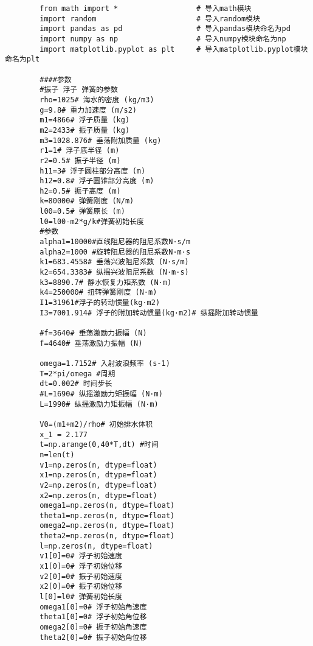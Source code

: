 \documentclass[a4paper,12pt]{article}
\begin{document}
	\begin{lstlisting}
		from math import *                  # 导入math模块
		import random                       # 导入random模块
		import pandas as pd                 # 导入pandas模块命名为pd
		import numpy as np                  # 导入numpy模块命名为np
		import matplotlib.pyplot as plt     # 导入matplotlib.pyplot模块命名为plt
		
		####参数
		#振子 浮子 弹簧的参数
		rho=1025# 海水的密度 (kg/m3)
		g=9.8# 重力加速度 (m/s2)
		m1=4866# 浮子质量 (kg)
		m2=2433# 振子质量 (kg)
		m3=1028.876# 垂荡附加质量 (kg)
		r1=1# 浮子底半径 (m)
		r2=0.5# 振子半径 (m)
		h11=3# 浮子圆柱部分高度 (m)
		h12=0.8# 浮子圆锥部分高度 (m)
		h2=0.5# 振子高度 (m)
		k=80000# 弹簧刚度 (N/m)
		l00=0.5# 弹簧原长 (m)
		l0=l00-m2*g/k#弹簧初始长度
		#参数
		alpha1=10000#直线阻尼器的阻尼系数N·s/m
		alpha2=1000 #旋转阻尼器的阻尼系数N·m·s
		k1=683.4558# 垂荡兴波阻尼系数 (N·s/m)
		k2=654.3383# 纵摇兴波阻尼系数 (N·m·s)
		k3=8890.7# 静水恢复力矩系数 (N·m)
		k4=250000# 扭转弹簧刚度 (N·m)
		I1=31961#浮子的转动惯量(kg·m2)
		I3=7001.914# 浮子的附加转动惯量(kg·m2)# 纵摇附加转动惯量
		
		#f=3640# 垂荡激励力振幅 (N)
		f=4640# 垂荡激励力振幅 (N)
		
		omega=1.7152# 入射波浪频率 (s-1)
		T=2*pi/omega #周期
		dt=0.002# 时间步长
		#L=1690# 纵摇激励力矩振幅 (N·m)
		L=1990# 纵摇激励力矩振幅 (N·m)
		
		V0=(m1+m2)/rho# 初始排水体积
		x_1 = 2.177
		t=np.arange(0,40*T,dt) #时间
		n=len(t)
		v1=np.zeros(n, dtype=float)
		x1=np.zeros(n, dtype=float)
		v2=np.zeros(n, dtype=float)
		x2=np.zeros(n, dtype=float)
		omega1=np.zeros(n, dtype=float)
		theta1=np.zeros(n, dtype=float)
		omega2=np.zeros(n, dtype=float)
		theta2=np.zeros(n, dtype=float)
		l=np.zeros(n, dtype=float)
		v1[0]=0# 浮子初始速度
		x1[0]=0# 浮子初始位移
		v2[0]=0# 振子初始速度
		x2[0]=0# 振子初始位移
		l[0]=l0# 弹簧初始长度
		omega1[0]=0# 浮子初始角速度
		theta1[0]=0# 浮子初始角位移
		omega2[0]=0# 振子初始角速度
		theta2[0]=0# 振子初始角位移
		

\end{lstlisting}
\end{document}
